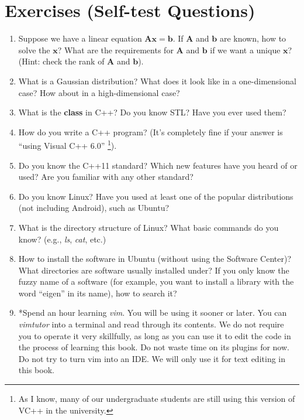 \section*{Exercises (Self-test Questions)}
\begin{enumerate}
	\item Suppose we have a linear equation $\mathbf{Ax}=\mathbf{b}$. If $\mathbf{A}$ and $\mathbf{b}$ are known, how to solve the $\mathbf{x}$? What are the requirements for $\mathbf{A}$ and $\mathbf{b}$ if we want a unique $\mathbf{x}$? (Hint: check the rank of $\mathbf{A}$ and $\mathbf{b}$).

	\item What is a Gaussian distribution? What does it look like in a one-dimensional case? How about in a high-dimensional case?

	\item What is the \textbf{class} in C++? Do you know STL? Have you ever used them?

	\item How do you write a C++ program? (It's completely fine if your answer is ``using Visual C++ 6.0'' \footnote{As I know, many of our undergraduate students are still using this version of VC++ in the university. }).

	\item Do you know the C++11 standard? Which new features have you heard of or used? Are you familiar with any other standard?

	\item Do you know Linux? Have you used at least one of the popular distributions (not including Android), such as Ubuntu?

	\item What is the directory structure of Linux? What basic commands do you know? (e.g., \textit{ls}, \textit{cat}, etc.)

	\item How to install the software in Ubuntu (without using the Software Center)? What directories are software usually installed under? If you only know the fuzzy name of a software (for example, you want to install a library with the word ``eigen'' in its name), how to search it?

	\item *Spend an hour learning \textit{vim}. You will be using it sooner or later. You can \textit{vimtutor} into a terminal and read through its contents. We do not require you to operate it very skillfully, as long as you can use it to edit the code in the process of learning this book. Do not waste time on its plugins for now. Do not try to turn vim into an IDE. We will only use it for text editing in this book.

\end{enumerate}
